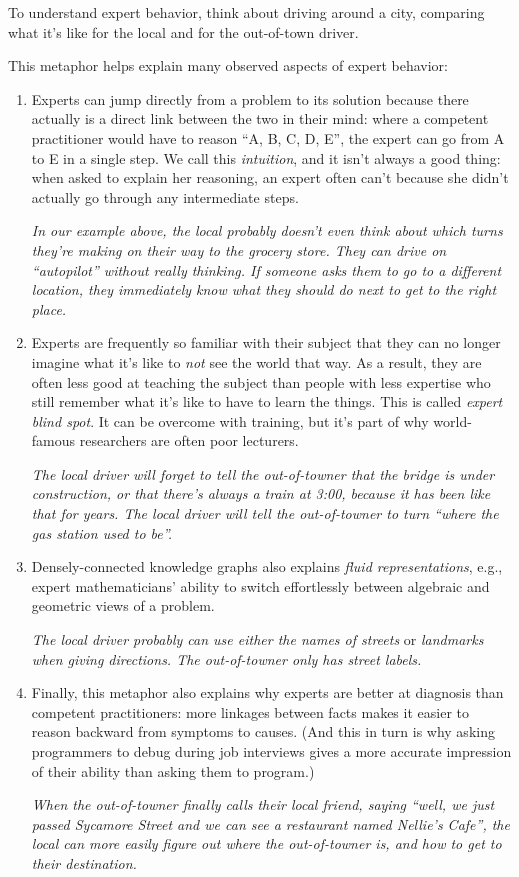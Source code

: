 To understand expert behavior, think about driving around a city, comparing what it's
like for the local and for the out-of-town driver.

This metaphor helps explain many observed aspects of expert behavior:

\begin{enumerate}
\item Experts can jump directly from a problem to its solution
because there actually is a direct link between the two in their mind:
where a competent practitioner would have to reason ``A, B, C, D, E'',
the expert can go from A to E in a single step.
We call this \emph{intuition},
and it isn't always a good thing:
when asked to explain her reasoning,
an expert often can't because she didn't actually go through any intermediate steps.

\emph{In our example above, the local probably doesn't even think about which
turns they're making on their way to the grocery store.  They can drive on
``autopilot'' without really thinking.  If someone asks them to go to a different
location, they immediately know what they should do next to get to the right place.}
\item Experts are frequently so familiar with their subject
that they can no longer imagine what it's like to \emph{not} see the world that way.
As a result,
they are often less good at teaching the subject than people with less expertise
who still remember what it's like to have to learn the things.
This is called \emph{expert blind spot}.
It can be overcome with training,
but it's part of why world-famous researchers are often poor lecturers.

\emph{The local driver will forget to tell the out-of-towner that the
bridge is under construction, or that there's always a train at
3:00, because it has been like that for years.  The local driver
will tell the out-of-towner to turn ``where the gas station used to
be''.}
\item Densely-connected knowledge graphs also explains \emph{fluid representations},
e.g.,
expert mathematicians' ability to switch effortlessly between algebraic and geometric views of a problem.

\emph{The local driver probably can use either the names of streets}
or
\emph{landmarks when giving directions. The out-of-towner only has street labels.}
\item Finally, this metaphor also explains why experts are better at diagnosis than competent practitioners:
more linkages between facts makes it easier to reason backward from symptoms to causes.
(And this in turn is why asking programmers to debug during job interviews
gives a more accurate impression of their ability than asking them to program.)

\emph{When the out-of-towner finally calls their local friend, saying ``well, we just passed
Sycamore Street and we can see a restaurant named Nellie's Cafe'', the local can
more easily figure out where the out-of-towner is, and how to get to their destination.}
\end{enumerate}

